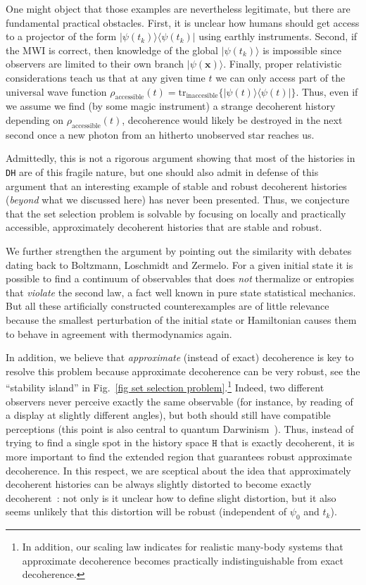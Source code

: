 \documentclass[pre,onecolumn,12pt,aps,longbibliography,nofootinbib]{revtex4-2}
\newcommand{\bb}[1]{\textbf{#1}}
\newcommand{\rl}[0]{{\rangle\langle}}
\newcommand{\blue}[1]{#1}
\begin{document}
One might object that those examples are nevertheless legitimate, but there are fundamental practical obstacles. First, it is unclear how humans should get access to a projector of the form $|\psi(t_k)\rl\psi(t_k)|$ using earthly instruments. Second, \blue{if the MWI is correct, then knowledge of the global $|\psi(t_k)\rangle$ is impossible since observers are limited to their own branch $|\psi(\bb x)\rangle$. Finally,} proper relativistic considerations teach us that at any given time $t$ we can only access part of the universal wave function $\rho_\text{accessible}(t) = \mbox{tr}_\text{inaccesible}\{|\psi(t)\rl\psi(t)|\}$. Thus, even if we assume we find (by some magic instrument) a strange decoherent history depending on $\rho_\text{accessible}(t)$, decoherence would likely be destroyed in the next second once a new photon from an hitherto unobserved star reaches us.

Admittedly, this is not a rigorous argument showing that most of the histories in \texttt{DH} are of this fragile nature, but one should also admit in defense of this argument that an interesting example of stable and robust decoherent histories (\emph{beyond} what we discussed here) has never been presented. Thus, we conjecture that the set selection problem is solvable by focusing on locally and practically accessible, approximately decoherent histories that are stable and robust.

We further strengthen the argument by pointing out the similarity with debates dating back to Boltzmann, Loschmidt and Zermelo. For a given initial state it is possible to find a continuum of observables that does \emph{not} thermalize or entropies that \emph{violate} the second law, a fact well known in pure state statistical mechanics. But all these artificially constructed counterexamples are of little relevance because the smallest perturbation of the initial state or Hamiltonian causes them to behave in agreement with thermodynamics again.

In addition, we believe that \emph{approximate} (instead of exact) decoherence is key to resolve this problem because approximate decoherence can be very robust, see the ``stability island'' in Fig.~\ref{fig set selection problem}.\footnote{In addition, our scaling law indicates for realistic many-body systems that approximate decoherence becomes practically indistinguishable from exact decoherence.} Indeed, two different observers never perceive exactly the same observable (for instance, by reading of a display at slightly different angles), but both should still have compatible perceptions (this point is also central to quantum Darwinism~\cite{ZurekNP2009, KorbiczQuantum2021, ZurekEnt2022}). Thus, instead of trying to find a single spot in the history space $\texttt{H}$ that is exactly decoherent, it is more important to find the extended region that guarantees robust approximate decoherence. In this respect, we are sceptical about the idea that approximately decoherent histories can be always slightly distorted to become exactly decoherent~\cite{DowkerKentPRL1995, DowkerKentJSP1996, HalliwellPRD2001, HalliwellPRA2005}: not only is it unclear how to define slight distortion, but it also seems unlikely that this distortion will be robust (independent of $\psi_0$ and $t_k$).
\end{document}
